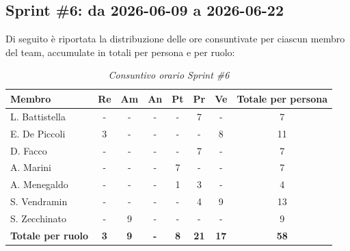 \documentclass[a4paper, 10pt, colorlinks=true, linkcolor=black, urlcolor=blue, citecolor=blue, hidelinks]{article}
\renewcommand{\arraystretch}{1.2}
\begin{document}
\subsection{Sprint \#6: da 2026-06-09 a 2026-06-22}
Di seguito è riportata la distribuzione delle ore consuntivate per ciascun membro del team, accumulate in totali per persona e per ruolo:

\begin{table}[H]
    \centering
    \renewcommand{\arraystretch}{1.4}
    \begin{tabular}{|l|c|c|c|c|c|c|c|}
        \hline
        \rowcolor{bluBitless!15}
        \textbf{Membro} & \textbf{Re} & \textbf{Am} & \textbf{An} & \textbf{Pt} & \textbf{Pr} & \textbf{Ve} & \textbf{Totale per persona} \\
        \hline
        L. Battistella & - & - & - & - & 7 & - & 7 \\ \hline
        E. De Piccoli & 3 & - & - & - & - & 8 & 11 \\ \hline
        D. Facco & - & - & - & - & 7 & - & 7 \\ \hline
        A. Marini & - & - & - & 7 & - & - & 7 \\ \hline
        A. Menegaldo & - & - & - & 1 & 3 & - & 4 \\ \hline
        S. Vendramin & - & - & - & - & 4 & 9 & 13 \\ \hline
        S. Zecchinato & - & 9 & - & - & - & - & 9 \\ \hline
        \rowcolor{bluBitless!8}
        \textbf{Totale per ruolo} & \textbf{3} & \textbf{9} & \textbf{-} & \textbf{8} & \textbf{21} & \textbf{17} & \textbf{58} \\
        \hline
    \end{tabular}
    \caption{\textit{Consuntivo orario Sprint \#6}}
\end{table}
\end{document}
